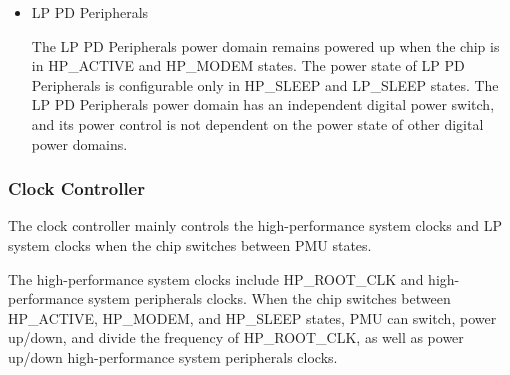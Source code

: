 \documentclass[main\_\_EN.tex]{subfiles}
\begin{document}
\begin{itemize}
    \item LP PD Peripherals

    The LP PD Peripherals power domain remains powered up when the chip is in HP\_ACTIVE and HP\_MODEM states. The power state of LP PD Peripherals is configurable only in HP\_SLEEP and LP\_SLEEP states. The LP PD Peripherals power domain has an independent digital power switch, and its power control is not dependent on the power state of other digital power domains.

\end{itemize}

\subsubsection{Clock Controller}

The clock controller mainly controls the high-performance system clocks and LP system clocks when the chip switches between PMU states.

The high-performance system clocks include HP\_ROOT\_CLK and high-performance system peripherals clocks. When the chip switches between HP\_ACTIVE, HP\_MODEM, and HP\_SLEEP states, PMU can switch, power up/down, and divide the frequency of HP\_ROOT\_CLK, as well as power up/down high-performance system peripherals clocks.
\end{document}
